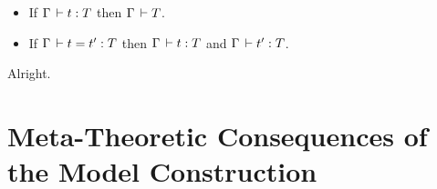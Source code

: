 \documentclass[a4paper,english]{lipics-utf8x}
\begin{document}
  \begin{corollary}
    \leavevmode
    \begin{itemize}
      \item If $\Gamma \,\vdash t : T$ then $\Gamma \,\vdash T$.
      \item If $\Gamma \,\vdash t = t' : T$ then $\Gamma \,\vdash t : T$ and
      $\Gamma \,\vdash t' : T$.
    \end{itemize}
  \end{corollary}
  Alright.

  \section{Meta-Theoretic Consequences of the Model Construction}

\end{document}
